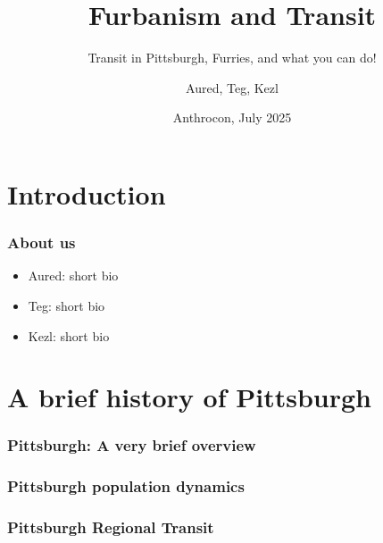 \documentclass{beamer}
\title[Introduction]{Furbanism and Transit}
\subtitle{Transit in Pittsburgh, Furries, and what you can do!}
\author{Aured, Teg, Kezl}
\date[Anthrocon 2025]{Anthrocon, July 2025}
\begin{document}
\frame{\titlepage}

\section{Introduction} 

\begin{frame}
\frametitle{About us}
\begin{itemize}
    \item Aured: short bio %
    \item Teg: short bio %
    \item Kezl: short bio %
\end{itemize}
\end{frame}

\section{A brief history of Pittsburgh}

\begin{frame}
\frametitle{Pittsburgh: A very brief overview}
\end{frame}

\begin{frame}
\frametitle{Pittsburgh population dynamics}
\end{frame}

\begin{frame}
\frametitle{Pittsburgh Regional Transit}
\end{frame}
\end{document}

